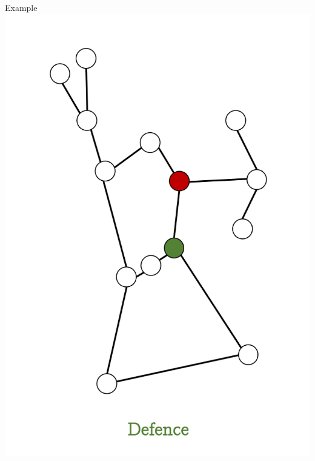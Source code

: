 \documentclass[unknownkeysallowed]{beamer}
\begin{document}
\begin{frame}{Example}
\centering\includegraphics[height=0.8\textheight]{assets/eg-fire/2}
\end{frame}
\end{document}
